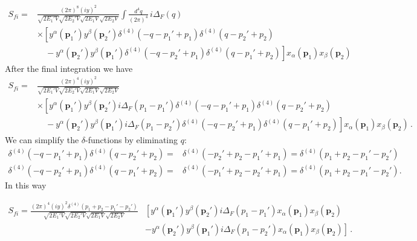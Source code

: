 \begin{align}
   S_{fi}
    =&\frac{(2\pi)^8(iy)^2 }{\sqrt{2 E_1'V}\sqrt{2 E_2'V}\sqrt{2 E_1V}\sqrt{2 E_2V}}\int\frac{d^4q}{(2\pi)^4}\,i\Delta_F(q)
\nonumber\\
&
 \times \left[ y^{\alpha}(\mathbf{p}_1')y^{\beta}(\mathbf{p}_2')\delta^{(4)}\left(-q-p_1'+p_1  \right)\delta^{(4)}\left(q-p_2'+p_2  \right)   \right. \nonumber\\
&\left. 
\quad    - y^{\alpha}(\mathbf{p}_2')y^{\beta}(\mathbf{p}_1')\delta^{(4)}\left(-q-p_2'+p_1  \right)\delta^{(4)}\left(q-p_1'+p_2  \right)
  \right]x_{\alpha}(\mathbf{p}_1)x_{\beta}(\mathbf{p}_2)
\end{align}
After the final integration we have
\begin{align}
     S_{fi}
    =&\frac{(2\pi)^4(iy)^2 }{\sqrt{2 E_1'V}\sqrt{2 E_2'V}\sqrt{2 E_1V}\sqrt{2 E_2V}}
\nonumber\\
&
 \times \left[ y^{\alpha}(\mathbf{p}_1')y^{\beta}(\mathbf{p}_2')i\Delta_F(p_1-p_1')\delta^{(4)}\left(-q-p_1'+p_1  \right)\delta^{(4)}\left(q-p_2'+p_2  \right)   \right. \nonumber\\
&\left. 
\quad    - y^{\alpha}(\mathbf{p}_2')y^{\beta}(\mathbf{p}_1')i\Delta_F(p_1-p_2')\delta^{(4)}\left(-q-p_2'+p_1  \right)\delta^{(4)}\left(q-p_1'+p_2  \right)
  \right]x_{\alpha}(\mathbf{p}_1)x_{\beta}(\mathbf{p}_2)\,.
\end{align}
We can simplify the $\delta$-functions by eliminating $q$:
\begin{align}
  \delta^{(4)}\left(-q-p_1'+p_1  \right)\delta^{(4)}\left(q-p_2'+p_2  \right)=&\delta^{(4)}\left(-p_2'+p_2-p_1'+p_1\right)=\delta^{(4)}\left(p_1+p_2-p_1'-p_2'\right) \nonumber\\
  \delta^{(4)}\left(-q-p_2'+p_1  \right)\delta^{(4)}\left(q-p_1'+p_2  \right)=&\delta^{(4)}\left(-p_1'+p_2-p_2'+p_1\right)=\delta^{(4)}\left(p_1+p_2-p_1'-p_2'\right). 
\end{align}
In this way

\begin{align}
     S_{fi}
    =\frac{(2\pi)^4(iy)^2\delta^{(4)}\left(p_1+p_2-p_1'-p_2'\right) }{\sqrt{2 E_1'V}\sqrt{2 E_2'V}\sqrt{2 E_1V}\sqrt{2 E_2V}}
  &\left[ y^{\alpha}(\mathbf{p}_1')y^{\beta}(\mathbf{p}_2')i\Delta_F(p_1-p_1')x_{\alpha}(\mathbf{p}_1)x_{\beta}(\mathbf{p}_2)   \right. \nonumber\\
&\left. 
  - y^{\alpha}(\mathbf{p}_2')y^{\beta}(\mathbf{p}_1')i\Delta_F(p_1-p_2')x_{\alpha}(\mathbf{p}_1)x_{\beta}(\mathbf{p}_2)
  \right]\,.
\end{align}

